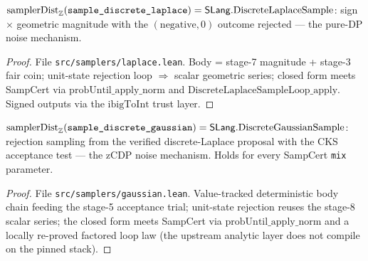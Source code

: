 \begin{theorem}\label{thm:discrete-laplace}
  \leanok
  \(\mathrm{samplerDist}_{\mathbb{Z}}(\texttt{sample\_discrete\_laplace}) =
  \mathsf{SLang}.\mathrm{DiscreteLaplaceSample}\): sign \(\times\) geometric magnitude with the
  \((\text{negative},0)\) outcome rejected --- the pure-DP noise mechanism. \statusDone
\end{theorem}
\begin{proof}\leanok
  File \texttt{src/samplers/laplace.lean}. Body = stage-7 magnitude + stage-3 fair coin;
  unit-state rejection loop \(\Rightarrow\) scalar geometric series; closed form meets
  SampCert via \(\mathrm{probUntil\_apply\_norm}\) and
  \(\mathrm{DiscreteLaplaceSampleLoop\_apply}\). Signed outputs via the
  \(\mathrm{ibigToInt}\) trust layer.
\end{proof}

\begin{theorem}\label{thm:discrete-gaussian}
  \leanok
  \(\mathrm{samplerDist}_{\mathbb{Z}}(\texttt{sample\_discrete\_gaussian}) =
  \mathsf{SLang}.\mathrm{DiscreteGaussianSample}\): rejection sampling from the verified
  discrete-Laplace proposal with the CKS acceptance test --- the zCDP noise mechanism.
  Holds for every SampCert \texttt{mix} parameter. \statusDone
\end{theorem}
\begin{proof}\leanok
  File \texttt{src/samplers/gaussian.lean}. Value-tracked deterministic body chain feeding
  the stage-5 acceptance trial; unit-state rejection reuses the stage-8 scalar series; the
  closed form meets SampCert via \(\mathrm{probUntil\_apply\_norm}\) and a locally
  re-proved factored loop law (the upstream analytic layer does not compile on the pinned
  stack).
\end{proof}
